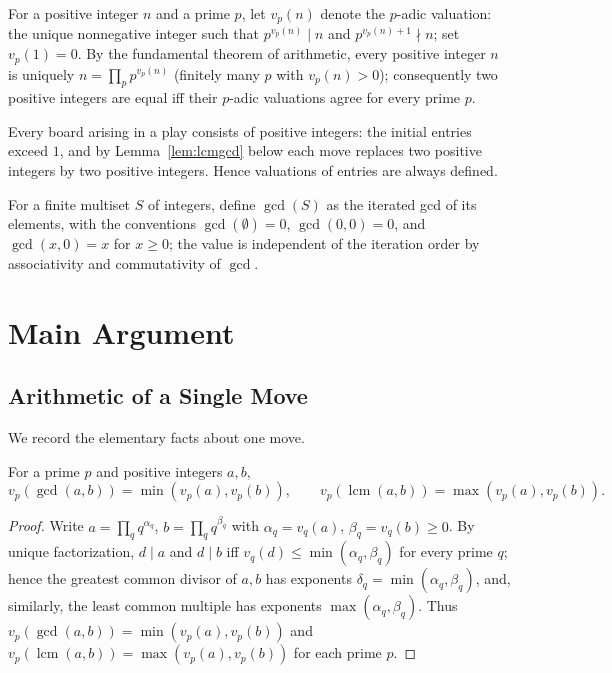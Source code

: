 \documentclass{article}
\DeclareMathOperator{\lcm}{lcm}
\begin{document}
For a positive integer $n$ and a prime $p$, let $v_p(n)$ denote the $p$-adic
valuation: the unique nonnegative integer such that $p^{v_p(n)}\mid n$ and
$p^{v_p(n)+1}\nmid n$; set $v_p(1)=0$. By the fundamental theorem of
arithmetic, every positive integer $n$ is uniquely
$n=\prod_p p^{v_p(n)}$ (finitely many $p$ with $v_p(n)>0$); consequently two
positive integers are equal iff their $p$-adic valuations agree for every
prime $p$.

Every board arising in a play consists of positive integers: the initial
entries exceed $1$, and by Lemma~\ref{lem:lcmgcd} below each move replaces two
positive integers by two positive integers. Hence valuations of entries are
always defined.

For a finite multiset $S$ of integers, define $\gcd(S)$ as the iterated gcd of
its elements, with the conventions $\gcd(\emptyset)=0$, $\gcd(0,0)=0$, and
$\gcd(x,0)=x$ for $x\geq 0$; the value is independent of the iteration order by
associativity and commutativity of $\gcd$.

\section{Main Argument}\label{sec:lemmas}

\subsection{Arithmetic of a Single Move}

We record the elementary facts about one move.

\begin{lemma}\label{lem:vpgcd}
For a prime $p$ and positive integers $a,b$,
\[
v_p(\gcd(a,b))=\min(v_p(a),v_p(b)),\qquad
v_p(\lcm(a,b))=\max(v_p(a),v_p(b)).
\]
\end{lemma}
\begin{proof}
Write $a=\prod_q q^{\alpha_q}$, $b=\prod_q q^{\beta_q}$ with $\alpha_q=v_q(a)$,
$\beta_q=v_q(b)\geq 0$. By unique factorization, $d\mid a$ and $d\mid b$ iff
$v_q(d)\leq\min(\alpha_q,\beta_q)$ for every prime $q$; hence the greatest
common divisor of $a,b$ has exponents $\delta_q=\min(\alpha_q,\beta_q)$, and,
similarly, the least common multiple has exponents
$\max(\alpha_q,\beta_q)$. Thus
$v_p(\gcd(a,b))=\min(v_p(a),v_p(b))$ and
$v_p(\lcm(a,b))=\max(v_p(a),v_p(b))$ for each prime $p$.
\end{proof}
\end{document}
